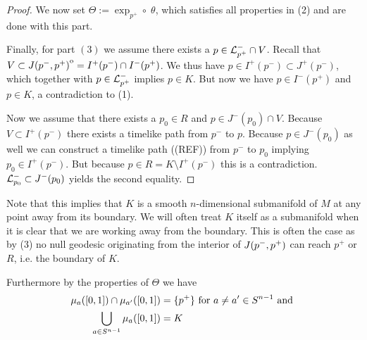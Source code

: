 \begin{proof}
We now set $\Theta:=\exp_{p^+}\circ \; \theta$, which satisfies all properties in (2) and are done with this part.

Finally, for part $(3)$ we assume there exists a $p\in {\mathcal{L}}^-_{p^+}\cap V$. Recall that $V\subset {\kern0ptJ(p^-,p^+)}^{\mathrm{o}}=I^+(p^-)\cap I^-(p^+)$. We thus have $p\in I^+(p^-)\subset J^+(p^-)$, which together with $p\in {\mathcal{L}}^-_{p^+}$ implies $p\in K$. But now we have $p\in I^-(p^+)$ and $p\in K$, a contradiction to (1).

Now we assume that there exists a $p_0\in R$ and $p\in J^-(p_0)\cap V$. Because $V\subset I^+(p^-)$ there exists a timelike path from $p^-$ to $p$. Because $p\in J^-(p_0)$ as well we can construct a timelike path ((REF)) from $p^-$ to $p_0$ implying $p_0\in I^+(p^-)$. But because $p\in R=K\setminus I^+(p^-)$ this is a contradiction. ${\mathcal{L}}^-_{p_0} \subset J^-(p_0)$ yields the second equality.
\end{proof}

Note that this implies that $K$ is a smooth $n$-dimensional submanifold of $M$ at any point away from its boundary. We will often treat $K$ itself as a submanifold when it is clear that we are working away from the boundary. This is often the case as by (3) no null geodesic originating from the interior of $J(p^-,p^+)$ can reach $p^+$ or $R$, i.e. the boundary of $K$.

Furthermore by the properties of $\Theta$ we have 
\begin{align}
    \mu_a([0,1])\cap \mu_{a'}([0,1]) &= \{p^+\} \text{ for } a\neq a'\in {S^{n-1}} \text{ and }\\
    \bigcup_{a\in {S^{n-1}}}\mu_a([0,1]) &= K
\end{align}

